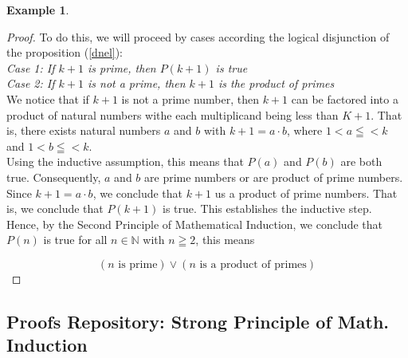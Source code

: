 \documentclass{book}
\theoremstyle{definition}
\newtheorem{example}{Example}[definition]
\theoremstyle{remark}
\newcommand{\bb}[1]{\mathbb{#1}}
\newcommand{\m}{\cdot}
\begin{document}
\begin{example}
\begin{proof}
            To do this, we will proceed by cases according the logical disjunction of the proposition (\ref{dnel}): \\
            
            \textit{Case 1: If $k+1$ is prime, then $P(k+1)$ is true} \\
            
            
            \textit{Case 2: If $k+1$ is not a prime, then $k+1$ is the product of primes} \\
            
            We notice that if $k+1$ is not a prime number, then $k+1$ can be factored into a product of natural numbers withe each multiplicand being less than $K+1$. That is, there exists natural numbers $a$ and $b$ with $k+1 = a \m b$, where $1 < a \leqq < k$ and $1 < b \leqq < k$. \\
            
            Using the inductive assumption, this means that $P(a)$ and $P(b)$ are both true. Consequently, $a$ and $b$ are prime numbers or are product of prime numbers. Since $k+1 = a \m b$, we conclude that $k+1$ us a product of prime numbers. That is, we conclude that $P(k+1)$ is true. This establishes the inductive step. \\
            
        Hence, by the Second Principle of Mathematical Induction, we conclude that $P(n)$ is true for all $n \in \bb{N}$ with $n \geqq 2$, this means   

            \begin{equation*}
                (n \text{ is prime}) \vee (n \text{ is a product of primes})
            \end{equation*}
\end{proof}
\end{example}





\newpage
\subsection{Proofs Repository: Strong Principle of Math. Induction}
\end{document}
